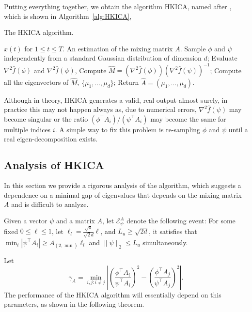 \documentclass[11pt]{article}
\newcommand{\EA}[1]{\mathcal{E}^A_{#1}}
\newcommand{\Epsi}{\EA{\psi}}
\begin{document}
Putting everything together, we obtain the algorithm HKICA, named after \citet{hsu2013learning}, which is shown in Algorithm~\ref{alg:HKICA},
\begin{algorithm}[H]
	\caption{The HKICA algorithm.}
	\label{alg:HKICA}
	\begin{algorithmic}[1]
		\INPUT $x(t)$ for $1\le t \le T$. 
		\OUTPUT An estimation of the mixing matrix $A$. 
		\STATE Sample $\phi$ and $\psi$ independently from a standard Gaussian distribution of dimension $d$;
		\STATE Evaluate $\nabla^2\hat{f}(\phi)$ and $\nabla^2\hat{f}(\psi)$, 
		\STATE Compute $\hat{M} = (\nabla^2 \hat{f}(\phi))(\nabla^2\hat{f}(\psi))^{-1}$;
		\STATE Compute all the eigenvectors of $\hat{M}$, $\{\mu_1,\ldots,\mu_d\}$;
		\STATE Return $\hat{A} = (\mu_1,\ldots,\mu_d)$.
	\end{algorithmic}
\end{algorithm}

\begin{remark}
	\label{rmk:symmetrization} 
	Although in theory, HKICA generates a valid, real output almost surely, in practice this may not happen always as, due to numerical errors, $\nabla^2\hat{f}(\psi)$ may become singular or the ratio $(\phi^\top A_i)/(\psi^\top A_i)$ may become the same for multiple indices $i$. A simple way to fix this problem is re-sampling $\phi$ and $\psi$ until a real eigen-decomposition exists.
\end{remark}

\subsection{Analysis of HKICA}
\label{subsec:ICAanalysisHKICA}
In this section we provide a rigorous analysis of the algorithm, which suggests a dependence on a minimal gap of eigenvalues that depends on the mixing matrix $A$ and is difficult to analyze.
\begin{definition}
	Given a vector $\psi$ and a matrix $A$, let $\Epsi$ denote the following event: For some fixed $0\le \ell\le 1$, let $\ell_l = \frac{\sqrt{\pi}}{\sqrt{2}d} \ell$, and $ L_u \ge \sqrt{2d}$, it satisfies that
	$\min_i |\psi^{\top}A_i| \ge A_{(2,\min)}\ell_l$ and $\|\psi\|_2 \le L_u$ simultaneously. 
\end{definition}
Let 
\begin{equation}
\label{def:kappa}
\gamma_A =  \min_{i,j: i\neq j} \left\vert \left(\frac{\phi^{\top}A_i}{\psi^{\top}A_i}\right)^2 - \left(\frac{\phi^{\top}A_j}{\psi^{\top}A_j}\right)^2 \right\vert.
\end{equation}
The performance of the HKICA algorithm will essentially depend on this parameters, as shown in the following theorem. 
\end{document}
